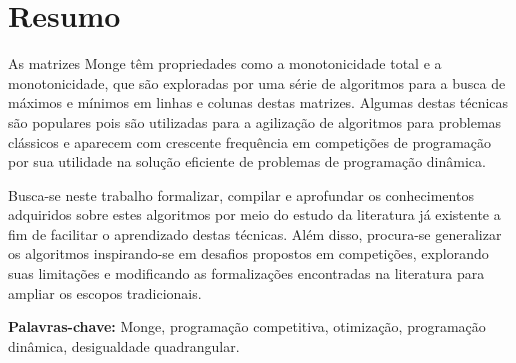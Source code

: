 \chapter*{Resumo}
\label{Resumo}

As matrizes Monge têm propriedades como a monotonicidade total e a monotonicidade, que são exploradas por uma série de algoritmos para a busca de máximos e mínimos em linhas e colunas destas matrizes. Algumas destas técnicas são populares pois são utilizadas para a agilização de algoritmos para problemas clássicos e aparecem com crescente frequência em competições de programação por sua utilidade na solução eficiente de problemas de programação dinâmica.

Busca-se neste trabalho formalizar, compilar e aprofundar os conhecimentos adquiridos sobre estes algoritmos por meio do estudo da literatura já existente a fim de facilitar o aprendizado destas técnicas. Além disso, procura-se generalizar os algoritmos inspirando-se em desafios propostos em competições, explorando suas limitações e modificando as formalizações encontradas na literatura para ampliar os escopos tradicionais. 

\textbf{Palavras-chave:} Monge, programação competitiva, otimização, programação dinâmica, desigualdade quadrangular.

%
%
%
